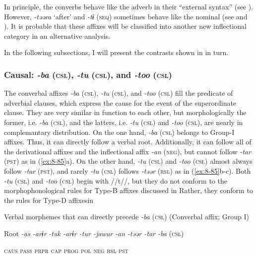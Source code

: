   In principle, the converbs behave like the adverb in their “external syntax” (see ). However, \textit{-təəra} ‘after’ and \textit{-tɨ} (\textsc{seq}) sometimes behave like the nominal (see  and ). It is probable that these affixes will be classified into another new inflectional category in an alternative analysis.

In the following subsections, I will present the contrasts shown in  in turn.

\subsubsection{Causal: \textit{-ba} (\textsc{csl}), \textit{-tu} (\textsc{csl}), and \textit{-too} (\textsc{csl})}

The converbal affixes \textit{-ba} (\textsc{csl}), \textit{-tu} (\textsc{csl}), and \textit{-too} (\textsc{csl}) fill the predicate of adverbial clauses, which express the cause for the event of the superordinate clause. They are very similar in function to each other, but morphologically the former, i.e. \textit{-ba} (\textsc{csl}), and the latters, i.e. \textit{-tu} (\textsc{csl}) and \textit{-too} (\textsc{csl}), are nearly in complemantary distribution. On the one hand, \textit{-ba} (\textsc{csl}) belongs to Group-I affixes. Thus, it can directly follow a verbal root. Additionally, it can follow all of the derivational affixes and the inflectional affix \textit{-an} (\textsc{neg}), but cannot follow \textit{-tar} (\textsc{pst}) as in (\ref{ex:8-85}a). On the other hand, \textit{-tu} (\textsc{csl}) and \textit{-too} (\textsc{csl}) almost always follow \textit{-tar} (\textsc{pst}), and rarely \textit{-tu} (\textsc{csl}) follows \textit{-təər} (\textsc{rsl}) as in (\ref{ex:8-85}b-c). Both \textit{-tu} (\textsc{csl}) and \textit{-too} (\textsc{csl}) begin with //t//, but they do not conform to the morphophonological rules for Type-B affixes discussed in  Rather, they conform to the rules for Type-D affixesin 

\ea\label{ex:8-85}
\ea Verbal morphemes that can directly precede \textit{-ba} (\textsc{csl}) (Converbal affix; Group I)

  Root  \textit{-as  -arɨr} %
\textit{-tuk  -arɨr  -tur  -jawur} %
\textit{-an  -təər  -tar  -ba} (\textsc{csl})

    \textsc{caus}  \textsc{pass}  \textsc{prpr}  \textsc{cap}  \textsc{prog}  \textsc{pol}  \textsc{neg}  \textsc{rsl}  \textsc{pst}

